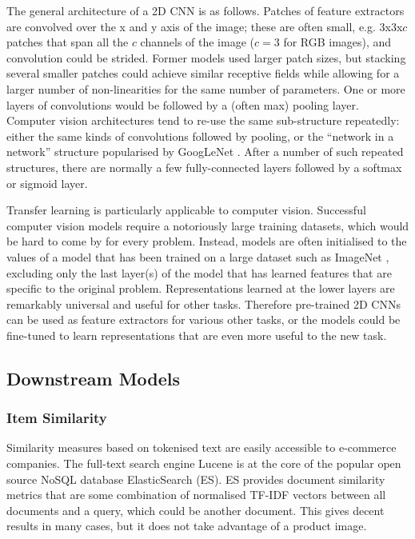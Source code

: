 The general architecture of a 2D CNN is as follows.
Patches of feature extractors are convolved over the x and y axis of the image; these are often small, e.g. 3x3x$c$ patches that span all the $c$ channels of the image ($c=3$ for RGB images), and convolution could be strided.
Former models used larger patch sizes, but stacking several smaller patches could achieve similar receptive fields while allowing for a larger number of non-linearities for the same number of parameters.
One or more layers of convolutions would be followed by a (often max) pooling layer.
Computer vision architectures tend to re-use the same sub-structure repeatedly: either the same kinds of convolutions followed by pooling, or the ``network in a network'' structure popularised by GoogLeNet \cite{googlenet}.
After a number of such repeated structures, there are normally a few fully-connected layers followed by a softmax or sigmoid layer.

Transfer learning is particularly applicable to computer vision.
Successful computer vision models require a notoriously large training datasets, which would be hard to come by for every problem.
Instead, models are often initialised to the values of a model that has been trained on a large dataset such as ImageNet \cite{imagenet}, excluding only the last layer(s) of the model that has learned features that are specific to the original problem.
Representations learned at the lower layers are remarkably  universal and useful for other tasks.
Therefore pre-trained 2D CNNs can be used as feature extractors for various other tasks,  or the models could be fine-tuned to learn representations that are even more useful to the new task.

\subsection{Downstream Models}

\subsubsection{Item Similarity}
\label{bg_sim}

Similarity measures based on tokenised text are easily accessible to e-commerce companies.
The full-text search engine Lucene is at the core of the popular open source NoSQL database ElasticSearch (ES).
ES provides document similarity metrics that are some combination of normalised TF-IDF vectors between all documents and a query, which could be another document.
This gives decent results in many cases, but it does not take advantage of a product image.

